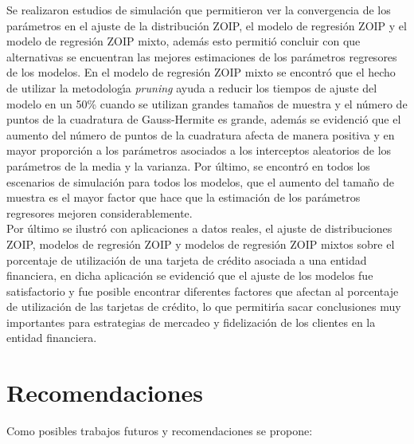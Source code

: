Se realizaron estudios de simulaci\'{o}n que permitieron ver la convergencia de los par\'{a}metros en el ajuste de la distribuci\'{o}n ZOIP, el modelo de regresi\'{o}n ZOIP y el modelo de regresi\'{o}n ZOIP mixto, adem\'{a}s esto permiti\'{o} concluir con que alternativas se encuentran las mejores estimaciones de los par\'{a}metros regresores de los modelos. En el modelo de regresi\'{o}n ZOIP mixto se encontr\'{o} que el hecho de utilizar la metodolog\'{\i}a \textit{pruning} ayuda a reducir los tiempos de ajuste del modelo en un 50\% cuando se utilizan grandes tama\~{n}os de muestra y el n\'{u}mero de puntos de la cuadratura de Gauss-Hermite es grande, adem\'{a}s se evidenci\'{o} que el aumento del n\'{u}mero de puntos de la cuadratura afecta de manera positiva y en mayor proporci\'{o}n a los par\'{a}metros asociados a los interceptos aleatorios de los par\'{a}metros de la media y la varianza. Por \'{u}ltimo, se encontr\'{o} en todos los escenarios de simulaci\'{o}n para todos los modelos, que el aumento del tama\~{n}o de muestra es el mayor factor que hace que la estimaci\'{o}n de los par\'{a}metros regresores mejoren considerablemente.\\

Por \'{u}ltimo se ilustr\'{o} con aplicaciones a datos reales, el ajuste de distribuciones ZOIP, modelos de regresi\'{o}n ZOIP y modelos de regresi\'{o}n ZOIP mixtos sobre el porcentaje de utilizaci\'{o}n de una tarjeta de cr\'{e}dito asociada a una entidad financiera, en dicha aplicaci\'{o}n se evidenci\'{o} que el ajuste de los modelos fue satisfactorio y  fue posible encontrar diferentes factores que afectan al porcentaje de utilizaci\'{o}n de las tarjetas de cr\'{e}dito, lo que permitir\'{\i}a sacar conclusiones muy importantes para estrategias de mercadeo y fidelizaci\'{o}n de los clientes en la entidad financiera.


\section{Recomendaciones}

Como posibles trabajos futuros y recomendaciones se propone:


